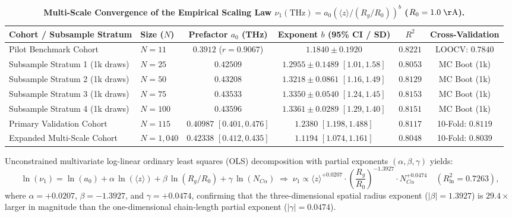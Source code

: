 \documentclass[11pt,onecolumn,letterpaper]{article}
\begin{document}
\begin{table}[h!]
\centering
\caption{\textbf{Multi-Scale Convergence of the Empirical Scaling Law $\nu_1(\mathrm{THz}) = a_0 (\langle z \rangle / (R_g / R_0))^b$ ($R_0 = 1.0\;\mathrm{\AA}$).}}
\vspace{4pt}
\footnotesize
\begin{tabular}{llcccc}
\toprule
\textbf{Cohort / Subsample Stratum} & \textbf{Size ($N$)} & \textbf{Prefactor $a_0$ (THz)} & \textbf{Exponent $b$ (95\% CI / SD)} & \textbf{$R^2$} & \textbf{Cross-Validation} \\
\midrule
Pilot Benchmark Cohort & $N = 11$ & $0.3912$ ($r = 0.9067$) & $1.1840 \pm 0.1920$ & $0.8221$ & LOOCV: $0.7840$ \\
Subsample Stratum 1 (1k draws) & $N = 25$ & $0.42509$ & $1.2955 \pm 0.1489$ $[1.01, 1.58]$ & $0.8053$ & MC Boot (1k) \\
Subsample Stratum 2 (1k draws) & $N = 50$ & $0.43208$ & $1.3218 \pm 0.0861$ $[1.16, 1.49]$ & $0.8129$ & MC Boot (1k) \\
Subsample Stratum 3 (1k draws) & $N = 75$ & $0.43533$ & $1.3350 \pm 0.0540$ $[1.24, 1.45]$ & $0.8153$ & MC Boot (1k) \\
Subsample Stratum 4 (1k draws) & $N = 100$ & $0.43596$ & $1.3361 \pm 0.0289$ $[1.29, 1.40]$ & $0.8151$ & MC Boot (1k) \\
Primary Validation Cohort & $N = 115$ & $0.40987$ $[0.401, 0.476]$ & $1.2380$ $[1.198, 1.488]$ & $0.8117$ & 10-Fold: $0.8119$ \\
Expanded Multi-Scale Cohort & $N = 1,040$ & $\mathbf{0.42338}$ $[0.412, 0.435]$ & $\mathbf{1.1194}$ $[1.074, 1.161]$ & $\mathbf{0.8048}$ & 10-Fold: $\mathbf{0.8039}$ \\
\bottomrule
\end{tabular}
\end{table}

Unconstrained multivariate log-linear ordinary least squares (OLS) decomposition with partial exponents $(\alpha, \beta, \gamma)$ yields:
\begin{equation}
\ln(\nu_1) = \ln(a_0) + \alpha\,\ln(\langle z \rangle) + \beta\,\ln(R_g / R_0) + \gamma\,\ln(N_{C\alpha}) \;\Longrightarrow\; \nu_1 \propto \langle z \rangle^{+0.0207} \cdot \left(\frac{R_g}{R_0}\right)^{-1.3927} \cdot N_{C\alpha}^{+0.0474} \quad (R^2_{\ln} = 0.7263),
\end{equation}
where $\alpha = +0.0207$, $\beta = -1.3927$, and $\gamma = +0.0474$, confirming that the three-dimensional spatial radius exponent ($|\beta| = 1.3927$) is $29.4\times$ larger in magnitude than the one-dimensional chain-length partial exponent ($|\gamma| = 0.0474$).
\end{document}
